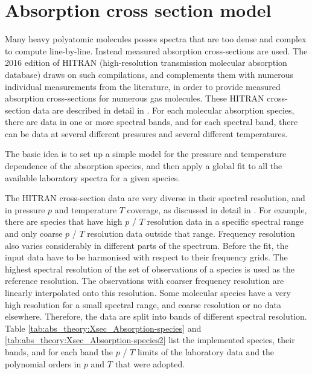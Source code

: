 \section{Absorption cross section model}
\label{sec:abs_theory:Absorption_cross_section_model}

Many heavy polyatomic molecules posses spectra that are too dense and 
complex to compute line-by-line. Instead measured absorption cross-sections
are used. The 2016 edition of HITRAN (high-resolution transmission molecular 
absorption database) draws on such compilations, and complements them with 
numerous individual measurements from the literature, in order to provide measured
absorption cross-sections for numerous gas molecules.
These HITRAN cross-section data are described in detail in 
\cite{gordon17:_hitran2016_jqsrt}. For each molecular absorption species, 
there are data in one or more spectral bands, and for each spectral band, there can be data at
several different pressures and several different temperatures.

The basic idea is to set up a simple model for the pressure and
temperature dependence of the absorption species, and then apply a
global fit to all the available laboratory spectra for a given
species. 

The HITRAN cross-section data are very diverse in their spectral
resolution, and in pressure $p$  and temperature $T$ coverage, as discussed in detail in
\cite{kochanov19:_infrared_jqsrt}. For example, there
are species that have high $p$ / $T$ resolution data in a specific
spectral range and only coarse $p$ / $T$ resolution data outside that
range. Frequency resolution also varies considerably in different
parts of the spectrum.
Before the fit, the input data have to be harmonised with
respect to their frequency grids.  The highest spectral resolution 
of the set of observations of a species is used as the reference resolution. 
The observations with coarser frequency resolution are linearly interpolated onto this
resolution.
Some molecular species have a very high resolution for a small
spectral range, and coarse resolution or no data elsewhere.
Therefore, the data are split into bands of different
spectral resolution. Table \ref{tab:abs_theory:Xsec_Absorption-species} and 
\ref{tab:abs_theory:Xsec_Absorption-species2} list the implemented species, their bands, 
and for each band the $p$ / $T$ limits of the laboratory data and the 
polynomial orders in $p$ and $T$ that were adopted.

